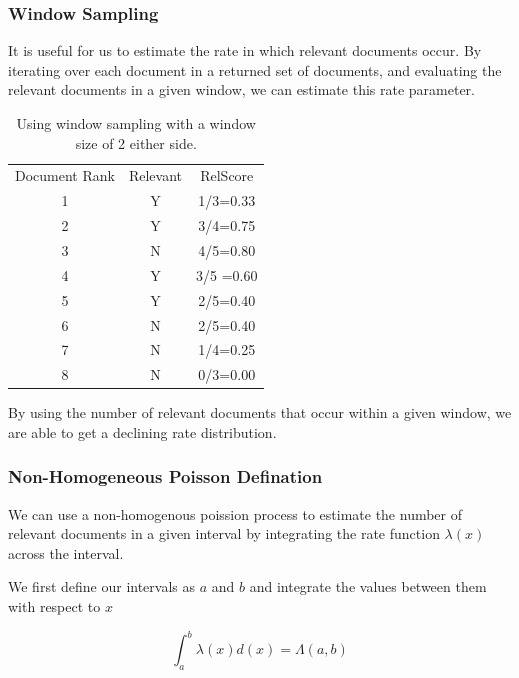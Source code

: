 \subsubsection{Window Sampling} \label{window_samp}

It is useful for us to estimate the rate in which relevant documents occur. By iterating over each document in a returned set of documents, and evaluating the relevant documents in a given window, we can estimate this rate parameter. 

\begin{table}[H]

\centering
\begin{tabular}{|c|c|c|} 
\hline
 Document Rank & Relevant & RelScore  \\ 
 1 & Y &			1/3=0.33 \\ 
 2 & Y &			3/4=0.75 \\ 
 3 & N &			4/5=0.80 \\ 
 4 & Y &			3/5 =0.60 \\ 
 5 & Y &			2/5=0.40 \\ 
 6 & N &			2/5=0.40 \\ 
 7 & N &			1/4=0.25 \\
 8 & N &			0/3=0.00 \\
  
 \hline
\end{tabular}

\caption{Using window sampling with a window size of 2 either side.}

\end{table}

By using the number of relevant documents that occur within a given window, we are able to get a declining rate distribution. 

\subsubsection{Non-Homogeneous Poisson Defination} \label{nn_pp_def}

We can use a non-homogenous poission process to estimate the number of relevant documents in a given interval by integrating the rate function $\lambda(x)$ across the interval.

We first define our intervals as $a$ and $b$ and integrate the values between them with respect to $x$

\begin{equation}
	   \int_a^b \lambda(x) d(x) = \Lambda(a, b)
\end{equation}

